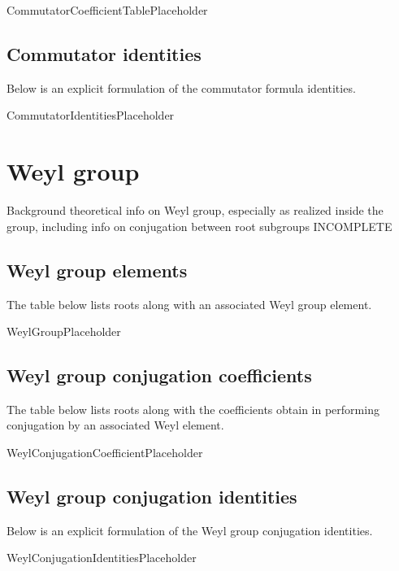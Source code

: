 \documentclass[11pt]{article}
\newcommand{\noi}{\noindent}
\theoremstyle{definition}
\begin{document}
CommutatorCoefficientTablePlaceholder

\subsection{Commutator identities}

\noi Below is an explicit formulation of the commutator formula identities.

CommutatorIdentitiesPlaceholder

\newpage
\section{Weyl group}

\noi Background theoretical info on Weyl group, especially as realized inside the group, including info on conjugation between root subgroups INCOMPLETE

\subsection{Weyl group elements}

\noi The table below lists roots along with an associated Weyl group element.

WeylGroupPlaceholder

\subsection{Weyl group conjugation coefficients}

\noi The table below lists roots along with the coefficients obtain in performing conjugation by an associated Weyl element.

WeylConjugationCoefficientPlaceholder

\subsection{Weyl group conjugation identities}

\noi Below is an explicit formulation of the Weyl group conjugation identities.

WeylConjugationIdentitiesPlaceholder
\end{document}
